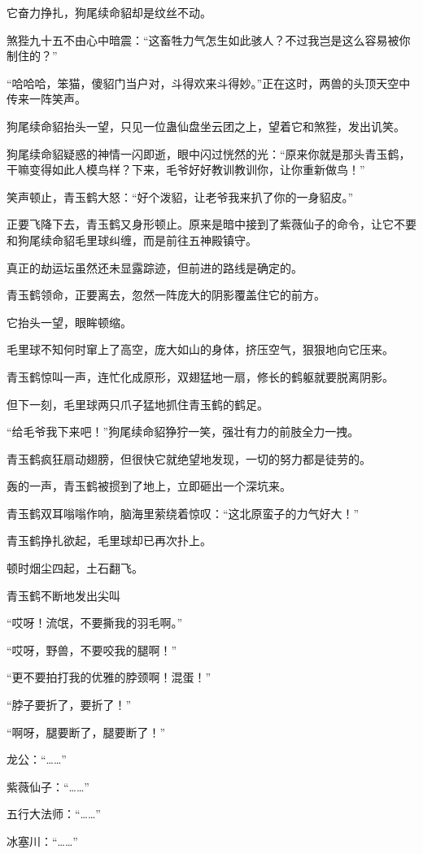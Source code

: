 \begin{this_body}
它奋力挣扎，狗尾续命貂却是纹丝不动。

煞狴九十五不由心中暗震：“这畜牲力气怎生如此骇人？不过我岂是这么容易被你制住的？”

“哈哈哈，笨猫，傻貂门当户对，斗得欢来斗得妙。”正在这时，两兽的头顶天空中传来一阵笑声。

狗尾续命貂抬头一望，只见一位蛊仙盘坐云团之上，望着它和煞狴，发出讥笑。

狗尾续命貂疑惑的神情一闪即逝，眼中闪过恍然的光：“原来你就是那头青玉鹤，干嘛变得如此人模鸟样？下来，毛爷好好教训教训你，让你重新做鸟！”

笑声顿止，青玉鹤大怒：“好个泼貂，让老爷我来扒了你的一身貂皮。”

正要飞降下去，青玉鹤又身形顿止。原来是暗中接到了紫薇仙子的命令，让它不要和狗尾续命貂毛里球纠缠，而是前往五神殿镇守。

真正的劫运坛虽然还未显露踪迹，但前进的路线是确定的。

青玉鹤领命，正要离去，忽然一阵庞大的阴影覆盖住它的前方。

它抬头一望，眼眸顿缩。

毛里球不知何时窜上了高空，庞大如山的身体，挤压空气，狠狠地向它压来。

青玉鹤惊叫一声，连忙化成原形，双翅猛地一扇，修长的鹤躯就要脱离阴影。

但下一刻，毛里球两只爪子猛地抓住青玉鹤的鹤足。

“给毛爷我下来吧！”狗尾续命貂狰狞一笑，强壮有力的前肢全力一拽。

青玉鹤疯狂扇动翅膀，但很快它就绝望地发现，一切的努力都是徒劳的。

轰的一声，青玉鹤被掼到了地上，立即砸出一个深坑来。

青玉鹤双耳嗡嗡作响，脑海里萦绕着惊叹：“这北原蛮子的力气好大！”

青玉鹤挣扎欲起，毛里球却已再次扑上。

顿时烟尘四起，土石翻飞。

青玉鹤不断地发出尖叫

“哎呀！流氓，不要撕我的羽毛啊。”

“哎呀，野兽，不要咬我的腿啊！”

“更不要拍打我的优雅的脖颈啊！混蛋！”

“脖子要折了，要折了！”

“啊呀，腿要断了，腿要断了！”

龙公：“……”

紫薇仙子：“……”

五行大法师：“……”

冰塞川：“……”


\end{this_body}
